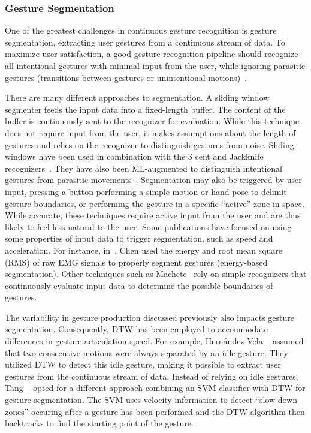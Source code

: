 \subsubsection{Gesture Segmentation} \label{sec:state_of_the_art:overview:challenges:segmentation}
One of the greatest challenges in continuous gesture recognition is gesture segmentation, \ie extracting user gestures from a continuous stream of data. To maximize user satisfaction, a good gesture recognition pipeline should recognize all intentional gestures with minimal input from the user, while ignoring parasitic gestures (\eg transitions between gestures or unintentional motions)~\cite{Ashbrook:2010}. 

There are many different approaches to segmentation.
% 
A sliding window segmenter feeds the input data into a fixed-length buffer. The content of the buffer is continuously sent to the recognizer for evaluation. While this technique does not require input from the user, it makes assumptions about the length of gestures and relies on the recognizer to distinguish gestures from noise. Sliding windows have been used in combination with the 3 cent and Jackknife recognizers~\cite{Caputo:2019, Taranta:2017}. They have also been ML-augmented to distinguish intentional gestures from parasitic movements~\cite{Kratz:2016}. 
%
Segmentation may also be triggered by user input, \eg pressing a button performing a simple motion or hand pose to delimit gesture boundaries, or performing the gesture in a specific ``active'' zone in space. While accurate, these techniques require active input from the user and are thus likely to feel less natural to the user.
% 
Some publications have focused on using some properties of input data to trigger segmentation, such as speed and acceleration. For instance, in~\cite{Chen:2016}, Chen \etal used the energy and root mean square (RMS) of raw EMG signals to properly segment gestures (energy-based segmentation). 
%
Other techniques such as Machete~\cite{Taranta:2021} rely on simple recognizers that continuously evaluate input data to determine the possible boundaries of gestures.

The variability in gesture production discussed previously also impacts gesture segmentation. Consequently, DTW has been employed to accommodate differences in gesture articulation speed. 
%
For example, Hernández-Vela \etal~\cite{HernandezVela:2014} assumed that two consecutive motions were always separated by an idle gesture. They utilized DTW to detect this idle gesture, making it possible to extract user gestures from the continuous stream of data.
%
Instead of relying on idle gestures, Tang \etal~\cite{Tang:2018} opted for a different approach combining an SVM classifier with DTW for gesture segmentation. The SVM uses velocity information to detect ``slow-down zones'' occuring after a gesture has been performed and the DTW algorithm then backtracks to find the starting point of the gesture.

